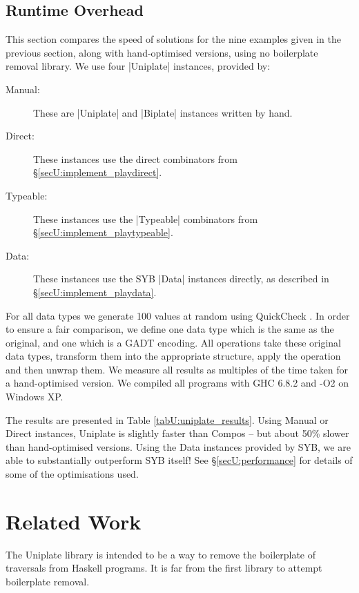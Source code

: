 \subsection{Runtime Overhead}
\label{secU:results_speed}

This section compares the speed of solutions for the nine examples given in the previous section, along with hand-optimised versions, using no boilerplate removal library. We use four |Uniplate| instances, provided by:

\begin{description}
\item[Manual:] These are |Uniplate| and |Biplate| instances written by hand.
\item[Direct:] These instances use the direct combinators from \S\ref{secU:implement_playdirect}.
\item[Typeable:] These instances use the |Typeable| combinators from \S\ref{secU:implement_playtypeable}.
\item[Data:] These instances use the SYB |Data| instances directly, as described in \S\ref{secU:implement_playdata}.
\end{description}

For all data types we generate 100 values at random using QuickCheck \citep{quickcheck}. In order to ensure a fair comparison, we define one data type which is the same as the original, and one which is a GADT encoding. All operations take these original data types, transform them into the appropriate structure, apply the operation and then unwrap them. We measure all results as multiples of the time taken for a hand-optimised version. We compiled all programs with GHC 6.8.2 and -O2 on Windows XP.

The results are presented in Table \ref{tabU:uniplate_results}. Using Manual or Direct instances, Uniplate is slightly faster than Compos -- but about 50\% slower than hand-optimised versions. Using the Data instances provided by SYB, we are able to substantially outperform SYB itself! See \S\ref{secU:performance} for details of some of the optimisations used.


\section{Related Work}
\label{secU:related}

The Uniplate library is intended to be a way to remove the boilerplate of traversals from Haskell programs. It is far from the first library to attempt boilerplate removal.

